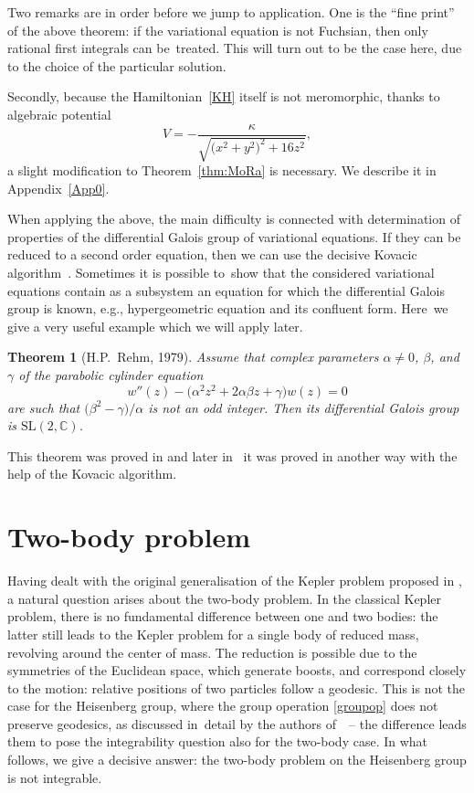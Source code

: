 \documentclass[11pt]{article}
\numberwithin{equation}{section}
\numberwithin{equation}{section}
\newtheorem{Theorem}{Theorem}[section]
\begin{document}
Two remarks are in order before we jump to application. One is the
``fine print'' of the above theorem: if the variational equation is
not Fuchsian, then only rational first integrals can be~treated. This
will turn out to be the case here, due to the choice of the particular
solution.

Secondly, because the Hamiltonian~\eqref{KH} itself is not
meromorphic, thanks to algebraic potential
\begin{equation*} %
 V= - \frac{\kappa}{\sqrt{\big(x^2+y^2\big)^2+{16}z^2}},
\end{equation*}
a slight modification to Theorem~\ref{thm:MoRa} is necessary. We describe it in Appendix~\ref{App0}.

When applying the above, the main difficulty is connected
with determination of properties of the differential Galois group of
variational equations. If they can be reduced to a second order equation, then we can use the decisive Kovacic
algorithm~\cite{3}. Sometimes it is possible to~show that the
considered variational equations contain as a subsystem an equation
for which the differential Galois group is known, e.g., hypergeometric
equation and its confluent form. Here~we give a very useful example
which we will apply later.
\begin{Theorem}[H.P.~Rehm, 1979] \label{thm:par}
 Assume that complex parameters $\alpha\neq 0$, $\beta$, and $\gamma$
 of the parabolic cylinder equation
 \begin{equation} \label{eq:5}
 w''(z) - \big(\alpha^2 z^2 +2 \alpha \beta z + \gamma\big) w(z)=0
 \end{equation}
 are such that $\big(\beta^2-\gamma\big)/\alpha$ is not an odd integer. Then
 its differential Galois group is $\mathrm{SL}(2,\mathbb{C})$.
\end{Theorem}
This theorem was proved in \cite{Rehm} and later in~\cite{baby} it was
proved in another way with the help of the Kovacic algorithm.

\setcounter{section}{2}
\section{Two-body problem}

Having dealt with the original generalisation of the Kepler problem
proposed in \cite{1}, a natural question arises about the two-body
problem. In the classical Kepler problem, there is no fundamental
difference between one and two bodies: the latter still leads to the
Kepler problem for a single body of reduced mass, revolving around the
center of mass. The reduction is possible due to the symmetries of the Euclidean space, which generate boosts, and correspond closely to the motion: relative positions of two particles follow a geodesic. This is not the case for the Heisenberg group, where the group operation \eqref{groupop} does not preserve geodesics, as discussed in~detail by the authors of~\cite{1}~-- the difference leads them to pose the integrability question also for the two-body case. In what follows, we give a decisive answer: the two-body problem on the Heisenberg group is not integrable.
\end{document}
